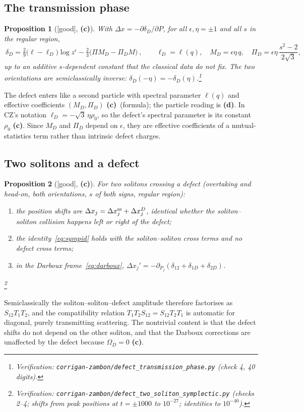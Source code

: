\documentclass[11pt,a4paper]{article}
\newcommand{\lab}[1]{{\normalfont\sffamily\footnotesize\bfseries(#1)}}
\newcommand{\Lc}{\lab{c}}
\newcommand{\Ld}{\lab{d}}
\newcommand{\eqtag}[2]{{\normalfont\sffamily\footnotesize\textcolor{#1}{[#2]}}}
\newcommand{\Good}{\eqtag{teal!70!black}{good}}
\newcommand{\scr}[1]{\nolinkurl{#1}}
\newcommand{\chk}[1]{\footnote{\raggedright Verification: #1.}}
\newtheorem{proposition}{Proposition}[section]
\theoremstyle{remark}
\begin{document}
\subsection{The transmission phase}

\begin{proposition}[\Good, \Lc]\label{prop:dD}
With $\Delta x=-\partial\delta_D/\partial P$, for all $\epsilon,\eta=\pm1$ and all $s$ in the regular region,
\begin{equation}\label{eq:dD}
\boxed{\ \delta_D=\tfrac29\big(\ell-\ell_D\big)\log z^{\epsilon}-\tfrac23\big(\Pi M_D-\Pi_DM\big)\ },\qquad
\ell_D=\ell(q),\quad M_D=\epsilon\eta\,q,\quad \Pi_D=\epsilon\eta\,\frac{s^2-2}{2\sqrt3},
\end{equation}
up to an additive $s$-dependent constant that the classical data do not fix. The two orientations are semiclassically inverse: $\delta_D(-\eta)=-\delta_D(\eta)$.\chk{\scr{corrigan-zambon/defect_transmission_phase.py} (check 4, 40 digits)}
\end{proposition}

The defect enters like a second particle with spectral parameter $\ell(q)$ and effective coefficients $(M_D,\Pi_D)$ \Lc\ (formula); the particle reading is \Ld. In CZ's notation $\ell_D=-\sqrt3\,\eta\rho_0$, so the defect's spectral parameter is its constant $\rho_0$ \Lc. Since $M_D$ and $\Pi_D$ depend on $\epsilon$, they are effective coefficients of a mutual-statistics term rather than intrinsic defect charges.

\subsection{Two solitons and a defect}

\begin{proposition}[\Good, \Lc]\label{prop:2sD}
For two solitons crossing a defect (overtaking and head-on, both orientations, $s$ of both signs, regular region):
\begin{enumerate}
\item the position shifts are $\Delta x_j=\Delta x_j^{\rm ss}+\Delta x_j^{D}$, identical whether the soliton--soliton collision happens left or right of the defect;
\item the identity~\eqref{eq:sympid} holds with the soliton--soliton cross terms and no defect cross terms;
\item in the Darboux frame~\eqref{eq:darboux}, $\Delta x_j'=-\partial_{P_j}(\delta_{12}+\delta_{1D}+\delta_{2D})$.
\end{enumerate}
\chk{\scr{corrigan-zambon/defect_two_soliton_symplectic.py} (checks 2--4; shifts from peak positions at $t=\pm1000$ to $10^{-27}$; identities to $10^{-40}$)}
\end{proposition}
Semiclassically the soliton--soliton--defect amplitude therefore factorises as $S_{12}T_1T_2$, and the compatibility relation $T_1T_2S_{12}=S_{12}T_2T_1$ is automatic for diagonal, purely transmitting scattering. The nontrivial content is that the defect shifts do not depend on the other soliton, and that the Darboux corrections are unaffected by the defect because $\Omega_D=0$ \Lc.
\end{document}

